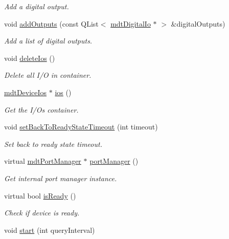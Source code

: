 \begin{DoxyCompactItemize}
\begin{DoxyCompactList}\small\item\em Add a digital output. \end{DoxyCompactList}\item 
void \hyperlink{classmdt_device_a3af87ab29bdd44019af739398a6987eb}{add\-Outputs} (const Q\-List$<$ \hyperlink{classmdt_digital_io}{mdt\-Digital\-Io} $\ast$ $>$ \&digital\-Outputs)
\begin{DoxyCompactList}\small\item\em Add a list of digital outputs. \end{DoxyCompactList}\item 
void \hyperlink{classmdt_device_a61032f15e601eb1bd74da80014bae593}{delete\-Ios} ()
\begin{DoxyCompactList}\small\item\em Delete all I/\-O in container. \end{DoxyCompactList}\item 
\hyperlink{classmdt_device_ios}{mdt\-Device\-Ios} $\ast$ \hyperlink{classmdt_device_adb7099877ad2080961fae5a40117e9e5}{ios} ()
\begin{DoxyCompactList}\small\item\em Get the I/\-Os container. \end{DoxyCompactList}\item 
void \hyperlink{classmdt_device_aa241c40514683254990e742cf1bbb155}{set\-Back\-To\-Ready\-State\-Timeout} (int timeout)
\begin{DoxyCompactList}\small\item\em Set back to ready state timeout. \end{DoxyCompactList}\item 
virtual \hyperlink{classmdt_port_manager}{mdt\-Port\-Manager} $\ast$ \hyperlink{classmdt_device_a06d9178b4133fd7b23084e712af20976}{port\-Manager} ()
\begin{DoxyCompactList}\small\item\em Get internal port manager instance. \end{DoxyCompactList}\item 
virtual bool \hyperlink{classmdt_device_a8887a1142d3d3be673c18cf3376e7af4}{is\-Ready} ()
\begin{DoxyCompactList}\small\item\em Check if device is ready. \end{DoxyCompactList}\item 
void \hyperlink{classmdt_device_a721c5bf2cfa0eef5304333f08da182f7}{start} (int query\-Interval)

\end{DoxyCompactItemize}
